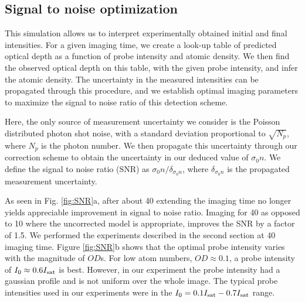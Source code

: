 \documentclass[12pt]{iopart}
\begin{document}
\subsection{Signal to noise optimization}
This simulation allows us to interpret experimentally obtained initial and final intensities. For a given imaging time, we create a look-up table of predicted optical depth as a function of probe intensity and atomic density. We then find the observed optical depth on this table, with the given probe intensity, and infer the atomic density. The uncertainty in the measured intensities can be propagated through this procedure, and we establish optimal imaging parameters to maximize the signal to noise ratio of this detection scheme. 
\par Here, the only source of measurement uncertainty we consider is the Poisson distributed photon shot noise, with a standard deviation proportional to $\sqrt{N_p}$, where $N_p$ is the photon number. We then propagate this uncertainty through our correction scheme to obtain the uncertainty in our deduced value of $\sigma_0 n$. We define the signal to noise ratio (SNR) as $\sigma_0 n/\delta_{\sigma_0 n}$, where $ \delta_{\sigma_0 n}$ is the propagated measurement uncertainty.
\par As seen in Fig. \ref{fig:SNR}a, after about 40\us{} extending the imaging time no longer yields appreciable improvement in signal to noise ratio. Imaging for 40\us{} as opposed to 10\us{} where the uncorrected model is appropriate, improves the SNR by a factor of  1.5. We performed the experiments described in the second section at 40\us{} imaging time. Figure \ref{fig:SNR}b shows that the optimal probe intensity varies with the magnitude of $OD$s. For low atom numbers, $OD\approx0.1$, a probe intensity of $I_0\approx0.6I_{\rm{sat}}$ is best. However, in our experiment the probe intensity had a gaussian profile and is not uniform over the whole image.  The typical probe intensities used in our experiments were in the $I_0=0.1I_{\rm{sat}}-0.7I_{\rm{sat}}$  range.
\end{document}
